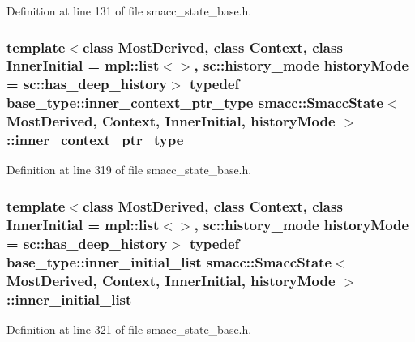 Definition at line 131 of file smacc\+\_\+state\+\_\+base.\+h.

\subsubsection[{\texorpdfstring{inner\+\_\+context\+\_\+ptr\+\_\+type}{inner_context_ptr_type}}]{\setlength{\rightskip}{0pt plus 5cm}template$<$class Most\+Derived, class Context, class Inner\+Initial = mpl\+::list$<$$>$, sc\+::history\+\_\+mode history\+Mode = sc\+::has\+\_\+deep\+\_\+history$>$ typedef base\+\_\+type\+::inner\+\_\+context\+\_\+ptr\+\_\+type {\bf smacc\+::\+Smacc\+State}$<$ Most\+Derived, Context, Inner\+Initial, history\+Mode $>$\+::{\bf inner\+\_\+context\+\_\+ptr\+\_\+type}}\hypertarget{classsmacc_1_1SmaccState_a65a772c2e2039e9a59148ba6ffb54d8a}{}\label{classsmacc_1_1SmaccState_a65a772c2e2039e9a59148ba6ffb54d8a}


Definition at line 319 of file smacc\+\_\+state\+\_\+base.\+h.

\subsubsection[{\texorpdfstring{inner\+\_\+initial\+\_\+list}{inner_initial_list}}]{\setlength{\rightskip}{0pt plus 5cm}template$<$class Most\+Derived, class Context, class Inner\+Initial = mpl\+::list$<$$>$, sc\+::history\+\_\+mode history\+Mode = sc\+::has\+\_\+deep\+\_\+history$>$ typedef base\+\_\+type\+::inner\+\_\+initial\+\_\+list {\bf smacc\+::\+Smacc\+State}$<$ Most\+Derived, Context, Inner\+Initial, history\+Mode $>$\+::{\bf inner\+\_\+initial\+\_\+list}}\hypertarget{classsmacc_1_1SmaccState_acb4ac84bce421d39b594510a6b2df558}{}\label{classsmacc_1_1SmaccState_acb4ac84bce421d39b594510a6b2df558}


Definition at line 321 of file smacc\+\_\+state\+\_\+base.\+h.

